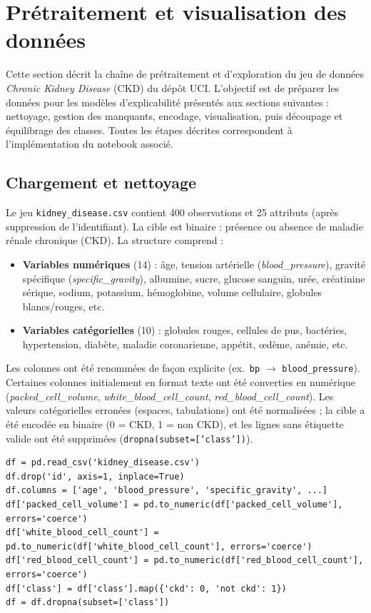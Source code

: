 \section{Prétraitement et visualisation des données}

Cette section décrit la chaîne de prétraitement et d'exploration du jeu de données \emph{Chronic Kidney Disease} (CKD) du dépôt UCI. L'objectif est de préparer les données pour les modèles d'explicabilité présentés aux sections suivantes : nettoyage, gestion des manquants, encodage, visualisation, puis découpage et équilibrage des classes. Toutes les étapes décrites correspondent à l'implémentation du notebook associé.

\subsection{Chargement et nettoyage}

Le jeu \texttt{kidney\_disease.csv} contient 400 observations et 25 attributs (après suppression de l'identifiant). La cible est binaire : présence ou absence de maladie rénale chronique (CKD). La structure comprend :
\begin{itemize}[noitemsep]
\item \textbf{Variables numériques} (14) : âge, tension artérielle (\emph{blood\_pressure}), gravité spécifique (\emph{specific\_gravity}), albumine, sucre, glucose sanguin, urée, créatinine sérique, sodium, potassium, hémoglobine, volume cellulaire, globules blancs/rouges, etc.
\item \textbf{Variables catégorielles} (10) : globules rouges, cellules de pus, bactéries, hypertension, diabète, maladie coronarienne, appétit, œdème, anémie, etc.
\end{itemize}

Les colonnes ont été renommées de façon explicite (ex.\ \texttt{bp} $\to$ \texttt{blood\_pressure}). Certaines colonnes initialement en format texte ont été converties en numérique (\emph{packed\_cell\_volume}, \emph{white\_blood\_cell\_count}, \emph{red\_blood\_cell\_count}). Les valeurs catégorielles erronées (espaces, tabulations) ont été normalisées ; la cible a été encodée en binaire (0 = CKD, 1 = non CKD), et les lignes sans étiquette valide ont été supprimées (\texttt{dropna(subset=['class'])}).

\begin{lstlisting}[style=reportPython]
df = pd.read_csv('kidney_disease.csv')
df.drop('id', axis=1, inplace=True)
df.columns = ['age', 'blood_pressure', 'specific_gravity', ...]
df['packed_cell_volume'] = pd.to_numeric(df['packed_cell_volume'], errors='coerce')
df['white_blood_cell_count'] = pd.to_numeric(df['white_blood_cell_count'], errors='coerce')
df['red_blood_cell_count'] = pd.to_numeric(df['red_blood_cell_count'], errors='coerce')
df['class'] = df['class'].map({'ckd': 0, 'not ckd': 1})
df = df.dropna(subset=['class'])
\end{lstlisting}

